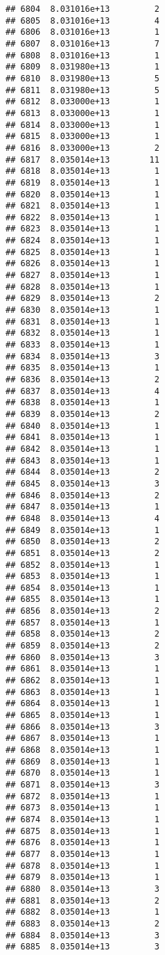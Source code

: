 \documentclass[
]{article}
\begin{document}
\begin{verbatim}
## 6804  8.031016e+13         2
## 6805  8.031016e+13         4
## 6806  8.031016e+13         1
## 6807  8.031016e+13         7
## 6808  8.031016e+13         1
## 6809  8.031980e+13         1
## 6810  8.031980e+13         5
## 6811  8.031980e+13         5
## 6812  8.033000e+13         1
## 6813  8.033000e+13         1
## 6814  8.033000e+13         1
## 6815  8.033000e+13         1
## 6816  8.033000e+13         2
## 6817  8.035014e+13        11
## 6818  8.035014e+13         1
## 6819  8.035014e+13         1
## 6820  8.035014e+13         1
## 6821  8.035014e+13         1
## 6822  8.035014e+13         1
## 6823  8.035014e+13         1
## 6824  8.035014e+13         1
## 6825  8.035014e+13         1
## 6826  8.035014e+13         1
## 6827  8.035014e+13         1
## 6828  8.035014e+13         1
## 6829  8.035014e+13         2
## 6830  8.035014e+13         1
## 6831  8.035014e+13         1
## 6832  8.035014e+13         1
## 6833  8.035014e+13         1
## 6834  8.035014e+13         3
## 6835  8.035014e+13         1
## 6836  8.035014e+13         2
## 6837  8.035014e+13         4
## 6838  8.035014e+13         1
## 6839  8.035014e+13         2
## 6840  8.035014e+13         1
## 6841  8.035014e+13         1
## 6842  8.035014e+13         1
## 6843  8.035014e+13         1
## 6844  8.035014e+13         2
## 6845  8.035014e+13         3
## 6846  8.035014e+13         2
## 6847  8.035014e+13         1
## 6848  8.035014e+13         4
## 6849  8.035014e+13         1
## 6850  8.035014e+13         2
## 6851  8.035014e+13         2
## 6852  8.035014e+13         1
## 6853  8.035014e+13         1
## 6854  8.035014e+13         1
## 6855  8.035014e+13         1
## 6856  8.035014e+13         2
## 6857  8.035014e+13         1
## 6858  8.035014e+13         2
## 6859  8.035014e+13         2
## 6860  8.035014e+13         3
## 6861  8.035014e+13         1
## 6862  8.035014e+13         1
## 6863  8.035014e+13         1
## 6864  8.035014e+13         1
## 6865  8.035014e+13         1
## 6866  8.035014e+13         3
## 6867  8.035014e+13         1
## 6868  8.035014e+13         1
## 6869  8.035014e+13         1
## 6870  8.035014e+13         1
## 6871  8.035014e+13         3
## 6872  8.035014e+13         1
## 6873  8.035014e+13         1
## 6874  8.035014e+13         1
## 6875  8.035014e+13         1
## 6876  8.035014e+13         1
## 6877  8.035014e+13         1
## 6878  8.035014e+13         1
## 6879  8.035014e+13         1
## 6880  8.035014e+13         3
## 6881  8.035014e+13         2
## 6882  8.035014e+13         1
## 6883  8.035014e+13         2
## 6884  8.035014e+13         3
## 6885  8.035014e+13         3

\end{verbatim}
\end{document}
